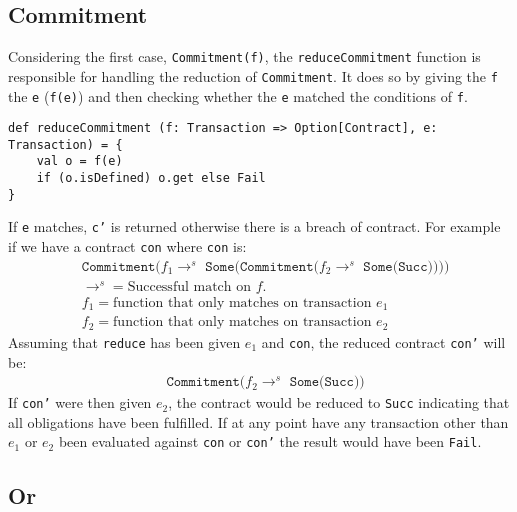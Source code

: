 \documentclass{ituthesis}
\begin{document}
\subsection{Commitment}

Considering the first case, \texttt{Commitment(f)}, the \texttt{reduceCommitment} function is responsible for handling the reduction of \texttt{Commitment}. It does so by giving the \texttt{f} the \texttt{e} (\texttt{f(e)}) and then checking whether the \texttt{e} matched the conditions of \texttt{f}.
\begin{lstlisting}
def reduceCommitment (f: Transaction => Option[Contract], e: Transaction) = {
    val o = f(e)
    if (o.isDefined) o.get else Fail
}
\end{lstlisting}
If \texttt{e} matches, \texttt{c'} is returned otherwise there is a breach of contract. For example if we have a contract \texttt{con} where \texttt{con} is:
\begin{align*}
&\texttt{Commitment($f_1 \rightarrow^s$ Some(Commitment($f_2 \rightarrow^s$ Some(Succ))))} \\
&\rightarrow^s = \text{Successful match on $f$.} \\
&f_1 = \text{function that only matches on transaction }e_1 \\
&f_2 = \text{function that only matches on transaction }e_2
\end{align*}
Assuming that \texttt{reduce} has been given $e_1$ and \texttt{con}, the reduced contract \texttt{con'} will be:
\begin{align*}
&\texttt{Commitment($f_2 \rightarrow^s$ Some(Succ))}
\end{align*}
If \texttt{con'} were then given $e_2$, the contract would be reduced to \texttt{Succ} indicating that all obligations have been fulfilled. If at any point have any transaction other than $e_1$ or $e_2$ been evaluated against \texttt{con} or \texttt{con'} the result would have been \texttt{Fail}.

\subsection{Or}
\end{document}
